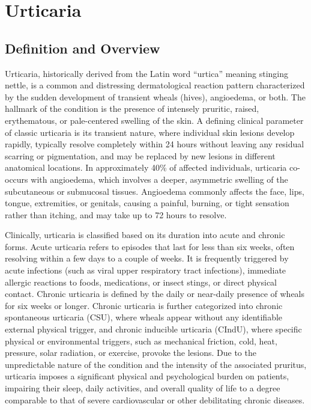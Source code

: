 \chapter{Urticaria}

\section*{Definition and Overview}
Urticaria, historically derived from the Latin word ``urtica'' meaning stinging nettle, is a common and distressing dermatological reaction pattern characterized by the sudden development of transient wheals (hives), angioedema, or both. The hallmark of the condition is the presence of intensely pruritic, raised, erythematous, or pale-centered swelling of the skin. A defining clinical parameter of classic urticaria is its transient nature, where individual skin lesions develop rapidly, typically resolve completely within 24 hours without leaving any residual scarring or pigmentation, and may be replaced by new lesions in different anatomical locations. In approximately 40\% of affected individuals, urticaria co-occurs with angioedema, which involves a deeper, asymmetric swelling of the subcutaneous or submucosal tissues. Angioedema commonly affects the face, lips, tongue, extremities, or genitals, causing a painful, burning, or tight sensation rather than itching, and may take up to 72 hours to resolve.

Clinically, urticaria is classified based on its duration into acute and chronic forms. Acute urticaria refers to episodes that last for less than six weeks, often resolving within a few days to a couple of weeks. It is frequently triggered by acute infections (such as viral upper respiratory tract infections), immediate allergic reactions to foods, medications, or insect stings, or direct physical contact. Chronic urticaria is defined by the daily or near-daily presence of wheals for six weeks or longer. Chronic urticaria is further categorized into chronic spontaneous urticaria (CSU), where wheals appear without any identifiable external physical trigger, and chronic inducible urticaria (CIndU), where specific physical or environmental triggers, such as mechanical friction, cold, heat, pressure, solar radiation, or exercise, provoke the lesions. Due to the unpredictable nature of the condition and the intensity of the associated pruritus, urticaria imposes a significant physical and psychological burden on patients, impairing their sleep, daily activities, and overall quality of life to a degree comparable to that of severe cardiovascular or other debilitating chronic diseases.

